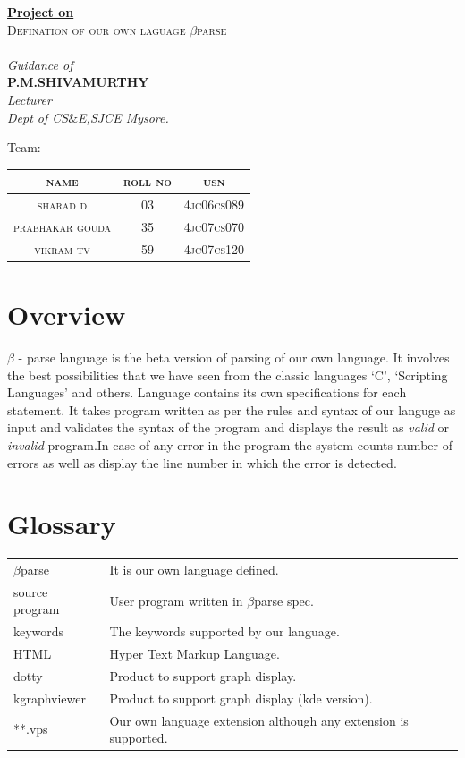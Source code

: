 \documentclass[12pt, oneside, a4paper]{article}
\begin{document}
\begin{center}
\textbf{\underline{Project on}}\\
\textsc{Defination of our own laguage $\beta$parse\\}
\emph{\\Guidance of}\\
\textbf{P.M.SHIVAMURTHY}\\
\textit{Lecturer}\\
\textit{Dept of CS$\&$E,SJCE Mysore.}\\
\end{center}
Team:
\begin{center}
\begin{tabular}{|c|c|c|}
\hline
\textsc{name}
&\textsc{roll no}
&\textsc{usn}
\\\hline
\textsc{sharad d}
&03
&\textsc{4jc06cs089}
\\\hline
\textsc{prabhakar gouda}
&35
&\textsc{4jc07cs070}
\\\hline
\textsc{vikram tv}
&59
&\textsc{4jc07cs120}
\\\hline
\end{tabular}
\end{center}
\newpage

\newpage
\thispagestyle{empty}
\tableofcontents
\newpage
{}

\section{Overview}
$\beta$ - parse language is the beta version of parsing of our own language.  It involves the best possibilities that we have seen from the classic languages `C', `Scripting Languages' and others.  Language contains its own specifications for each statement.  It takes program written as per the rules and syntax of our languge as input and validates the syntax of the program and displays the result as \emph {valid} or \emph{invalid} program.In case of any error in the program the system counts number of errors as well as display the line number in which the error is detected.\\

\section{Glossary}
\begin{tabular}{ll}
$\beta$parse & It is our own language defined.\\
source program & User program written in $\beta$parse spec.\\
keywords & The keywords supported by our language.\\
HTML & Hyper Text Markup Language.\\
dotty & Product to support graph display.\\
kgraphviewer & Product to support graph display (kde version).\\
**.vps & Our own language extension although any extension is supported.\\
\end{tabular}
\end{document}
